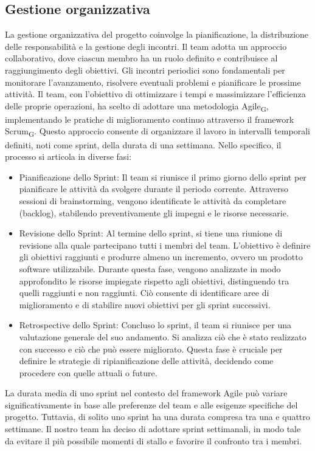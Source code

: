 \documentclass{article}
\begin{document}
\subsection{Gestione organizzativa}
La gestione organizzativa del progetto coinvolge la pianificazione, la distribuzione delle responsabilità e la gestione degli incontri. Il team adotta un approccio collaborativo, dove ciascun membro ha un ruolo definito e contribuisce al raggiungimento degli obiettivi. Gli incontri periodici sono fondamentali per monitorare l'avanzamento, risolvere eventuali problemi e pianificare le prossime attività. Il team, con l'obiettivo di ottimizzare i tempi e massimizzare l'efficienza delle proprie operazioni, ha scelto di adottare una metodologia Agile\textsubscript{G}, implementando le pratiche di miglioramento continuo attraverso il framework Scrum\textsubscript{G}. Questo approccio consente di organizzare il lavoro in intervalli temporali definiti, noti come sprint, della durata di una settimana. Nello specifico, il processo si articola in diverse fasi:
\begin{itemize}
    \item Pianificazione dello Sprint: Il team si riunisce il primo giorno dello sprint per pianificare le attività da svolgere durante il periodo corrente. Attraverso sessioni di brainstorming, vengono identificate le attività da completare (backlog), stabilendo preventivamente gli impegni e le risorse necessarie.
    \item Revisione dello Sprint: Al termine dello sprint, si tiene una riunione di revisione alla quale partecipano tutti i membri del team. L'obiettivo è definire gli obiettivi raggiunti e produrre almeno un incremento, ovvero un prodotto software utilizzabile. Durante questa fase, vengono analizzate in modo approfondito le risorse impiegate rispetto agli obiettivi, distinguendo tra quelli raggiunti e non raggiunti. Ciò consente di identificare aree di miglioramento e di stabilire nuovi obiettivi per gli sprint successivi.
    \item Retrospective dello Sprint: Concluso lo sprint, il team si riunisce per una valutazione generale del suo andamento. Si analizza ciò che è stato realizzato con successo e ciò che può essere migliorato. Questa fase è cruciale per definire le strategie di ripianificazione delle attività, decidendo come procedere con quelle attuali o future.
\end{itemize}
La durata media di uno sprint nel contesto del framework Agile può variare significativamente in base alle preferenze del team e alle esigenze specifiche del progetto. Tuttavia, di solito uno sprint ha una durata compresa tra una e quattro settimane. Il nostro team ha deciso di adottare sprint settimanali, in modo tale da evitare il più possibile momenti di stallo e favorire il confronto tra i membri.
\end{document}
